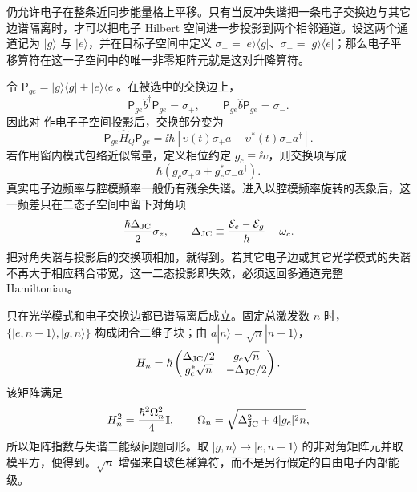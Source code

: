 \begin{exbox}
\medskip

 仍允许电子在整条近同步能量格上平移。只有当反冲失谐把一条电子交换边与其它边谱隔离时，才可以把电子 Hilbert 空间进一步投影到两个相邻通道。设这两个通道记为 $|g\rangle$ 与 $|e\rangle$，并在目标子空间中定义 $\sigma_+=|e\rangle\langle g|$、$\sigma_-=|g\rangle\langle e|$；那么电子平移算符在这一子空间中的唯一非零矩阵元就是这对升降算符。

令 $\mathsf P_{ge}=|g\rangle\langle g|+|e\rangle\langle e|$。在被选中的交换边上，
\begin{equation*}
 \mathsf P_{ge}\hat b^\dagger\mathsf P_{ge}=\sigma_+,
 \qquad
 \mathsf P_{ge}\hat b\mathsf P_{ge}=\sigma_-.
\end{equation*}
因此对 作电子子空间投影后，交换部分变为
\begin{equation*}
 \mathsf P_{ge}\hat H_Q\mathsf P_{ge}
 =\ii\hbar\left[\upsilon(t)\sigma_+a
 -\upsilon^*(t)\sigma_-a^\dagger\right].
\end{equation*}
若作用窗内模式包络近似常量，定义相位约定 $g_c\equiv\ii\upsilon$，则交换项写成
\begin{equation*}
 \hbar\left(g_c\sigma_+a+g_c^*\sigma_-a^\dagger\right).
\end{equation*}
真实电子边频率与腔模频率一般仍有残余失谐。进入以腔模频率旋转的表象后，这一频差只在二态子空间中留下对角项
\begin{equation*}
 \frac{\hbar\Delta_{\rm JC}}{2}\sigma_z,
 \qquad
 \Delta_{\rm JC}
 \equiv\frac{\mathcal E_e-\mathcal E_g}{\hbar}-\omega_c.
\end{equation*}
把对角失谐与投影后的交换项相加，就得到。若其它电子边或其它光学模式的失谐不再大于相应耦合带宽，这一二态投影即失效，必须返回多通道完整 Hamiltonian。

\medskip

 只在光学模式和电子交换边都已谱隔离后成立。固定总激发数 $n$ 时，$\{|e,n-1\rangle,|g,n\rangle\}$ 构成闭合二维子块；由 $a|n\rangle=\sqrt n|n-1\rangle$，
\[
H_n=\hbar
\begin{pmatrix}
\Delta_{\rm JC}/2&g_c\sqrt n\\
g_c^*\sqrt n&-\Delta_{\rm JC}/2
\end{pmatrix}.
\]
该矩阵满足
\[
H_n^2=\frac{\hbar^2\Omega_n^2}{4}\mathbb I,
\qquad
\Omega_n=\sqrt{\Delta_{\rm JC}^2+4|g_c|^2n},
\]
所以矩阵指数与失谐二能级问题同形。取 $|g,n\rangle\to|e,n-1\rangle$ 的非对角矩阵元并取模平方，便得到。$\sqrt n$ 增强来自玻色梯算符，而不是另行假定的自由电子内部能级。
\end{exbox}




